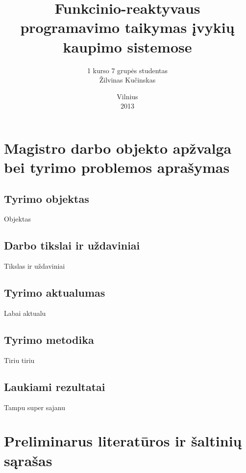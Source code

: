 \documentclass[12pt, a4paper, lithuanian]{article}
\title{Funkcinio-reaktyvaus programavimo taikymas įvykių kaupimo sistemose}
\author{
    1 kurso 7 grupės studentas \\
    Žilvinas Kučinskas
}
\date{Vilnius \\ 2013}
\begin{document}
\maketitle

\tableofcontents

\section{Magistro darbo objekto apžvalga bei tyrimo problemos aprašymas}

\subsection{Tyrimo objektas}

Objektas

\subsection{Darbo tikslai ir uždaviniai}

Tikslas ir uždaviniai

\subsection{Tyrimo aktualumas}

Labai aktualu

\subsection{Tyrimo metodika}

Tiriu tiriu

\subsection{Laukiami rezultatai}

Tampu super sajanu

\section{Preliminarus literatūros ir šaltinių sąrašas}

\nocite{*}

\end{document}
